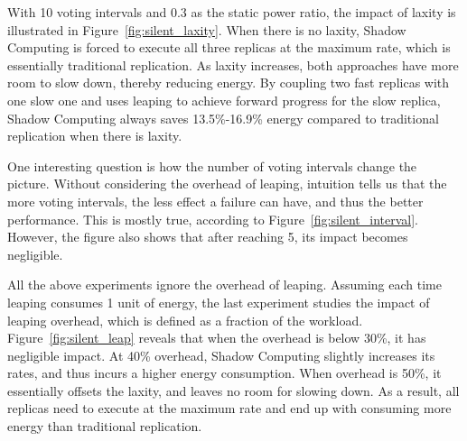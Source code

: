 With 10 voting intervals and 0.3 as the static power ratio, the impact of laxity is illustrated in Figure~\ref{fig:silent_laxity}. When there is no laxity, Shadow Computing is forced to execute all three replicas at the maximum rate, which is essentially traditional replication. As laxity increases, both approaches have more room to slow down, thereby reducing energy. By coupling two fast replicas with one slow one and uses leaping to achieve forward progress for the slow replica, Shadow Computing always saves 13.5\%-16.9\% energy compared to traditional replication when there is laxity.

One interesting question is how the number of voting intervals change the picture. Without considering the overhead of leaping, intuition tells us that the more voting intervals, the less effect a failure can have, and thus the better performance. This is mostly true, according to Figure~\ref{fig:silent_interval}. However, the figure also shows that after reaching 5, its impact becomes negligible. 

All the above experiments ignore the overhead of leaping. Assuming each time leaping consumes 1 unit of energy, the last experiment studies the impact of leaping overhead, which is defined as a fraction of the workload. Figure~\ref{fig:silent_leap} reveals that when the overhead is below 30\%, it has negligible impact. At 40\% overhead, Shadow Computing slightly increases its rates, and thus incurs a higher energy consumption. When overhead is 50\%, it essentially offsets the laxity, and leaves no room for slowing down. As a result, all replicas need to execute at the maximum rate and end up with consuming more energy than traditional replication.  





